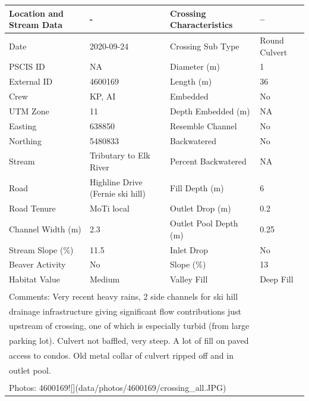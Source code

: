 \documentclass[
]{book}
\begin{document}
\begin{tabular}{l|l|l|l}
\hline
Location and Stream Data & - & Crossing Characteristics & --\\
\hline
Date & 2020-09-24 & Crossing Sub Type & Round Culvert\\
\hline
PSCIS ID & NA & Diameter (m) & 1\\
\hline
External ID & 4600169 & Length (m) & 36\\
\hline
Crew & KP, AI & Embedded & No\\
\hline
UTM Zone & 11 & Depth Embedded (m) & NA\\
\hline
Easting & 638850 & Resemble Channel & No\\
\hline
Northing & 5480833 & Backwatered & No\\
\hline
Stream & Tributary to Elk River & Percent Backwatered & NA\\
\hline
Road & Highline Drive (Fernie ski hill) & Fill Depth (m) & 6\\
\hline
Road Tenure & MoTi local & Outlet Drop (m) & 0.2\\
\hline
Channel Width (m) & 2.3 & Outlet Pool Depth (m) & 0.25\\
\hline
Stream Slope (\%) & 11.5 & Inlet Drop & No\\
\hline
Beaver Activity & No & Slope (\%) & 13\\
\hline
Habitat Value & Medium & Valley Fill & Deep Fill\\
\hline
\multicolumn{4}{l}{\textsuperscript{} Comments: Very recent heavy rains, 2 side channels for ski hill}\\
\multicolumn{4}{l}{drainage infrastructure giving significant flow contributions just}\\
\multicolumn{4}{l}{upstream of crossing, one of which is especially turbid (from large}\\
\multicolumn{4}{l}{parking lot). Culvert not baffled, very steep. A lot of fill on paved}\\
\multicolumn{4}{l}{access to condos. Old metal collar of culvert ripped off and in}\\
\multicolumn{4}{l}{outlet pool.}\\
\multicolumn{4}{l}{\textsuperscript{} Photos: 4600169![](data/photos/4600169/crossing\_all.JPG)}\\
\end{tabular}
\end{document}
